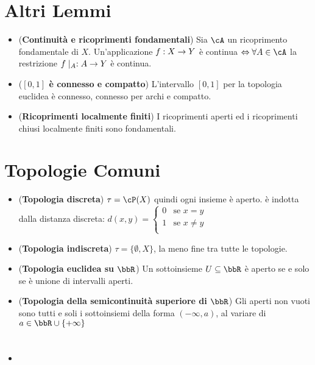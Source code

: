 \documentclass[a4paper,NoNotes,GeneralMath]{stdmdoc}
\begin{document}
	\section*{Altri Lemmi}
	\begin{itemize}
		\item ({\bf Continuità e ricoprimenti fondamentali}) Sia $\cA$ un ricoprimento fondamentale di $X$. Un'applicazione $f:X \rightarrow Y$ è continua $\sse \forall A \in \cA$ la restrizione $f\mid_A: A \rightarrow Y$ è continua.
		\item ({\bf $[0,1]$ è connesso e compatto}) L'intervallo $[0,1]$ per la topologia euclidea è connesso, connesso per archi e compatto.
		\item ({\bf Ricoprimenti localmente finiti}) I ricoprimenti aperti ed i ricoprimenti chiusi localmente finiti sono fondamentali.
	\end{itemize}	


	\section*{Topologie Comuni}
	\begin{itemize}
		\item ({\bf Topologia discreta}) $\tau = \cP (X)$ quindi ogni insieme è aperto. è indotta dalla distanza discreta: $d(x,y) = \left\{ \begin{array}{cr} 0 & \text{se } x = y \\ 1 & \text{se } x \neq y \\ \end{array} \right. $
		\item ({\bf Topologia indiscreta}) $\tau = \{\emptyset, X\}$, la meno fine tra tutte le topologie.
		\item ({\bf Topologia euclidea su $\bbR$}) Un sottoinsieme $U \subseteq \bbR$ è aperto se e solo se è unione di intervalli aperti.
		\item ({\bf Topologia della semicontinuità superiore di $\bbR$}) Gli aperti non vuoti sono tutti e soli i sottoinsiemi della forma $( - \infty , a)$, al variare di $a \in \bbR \cup \{+ \infty\}$
	\end{itemize}

	\section*{}
	\begin{itemize}
		\item 
	\end{itemize}
\end{document}
